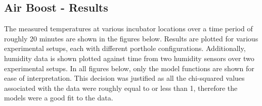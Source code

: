 \documentclass{article}
\begin{document}
\subsection{Air Boost - Results}

The measured temperatures at various incubator locations over a time period of roughly 20 minutes are shown in the figures below. Results are plotted for various experimental setups, each with different porthole configurations. Additionally, humidity data is shown plotted against time from two humidity sensors over two experimental setups. In all figures below, only the model functions are shown for ease of interpretation. This decision was justified as all the chi-squared values associated with the data were roughly equal to or less than 1, therefore the models were a good fit to the data. 

\vspace{3mm}
\end{document}

